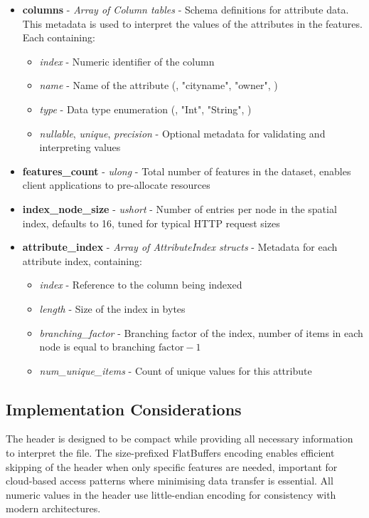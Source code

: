 \begin{itemize}
  \item \textbf{columns} - \textit{Array of Column tables} - Schema definitions for attribute data. This metadata is used to interpret the values of the attributes in the features. Each containing:
    \begin{itemize}
      \item \textit{index} - Numeric identifier of the column
      \item \textit{name} - Name of the attribute (\eg, "cityname", "owner", \etc)
      \item \textit{type} - Data type enumeration (\eg, "Int", "String", \etc)
      \item \textit{nullable}, \textit{unique}, \textit{precision} - Optional metadata for validating and interpreting values
    \end{itemize}

  \item \textbf{features\_count} - \textit{ulong} - Total number of features in the dataset, enables client applications to pre-allocate resources

  \item \textbf{index\_node\_size} - \textit{ushort} - Number of entries per node in the spatial index, defaults to 16, tuned for typical HTTP request sizes

  \item \textbf{attribute\_index} - \textit{Array of AttributeIndex structs} - Metadata for each attribute index, containing:
    \begin{itemize}
      \item \textit{index} - Reference to the column being indexed
      \item \textit{length} - Size of the index in bytes
      \item \textit{branching\_factor} - Branching factor of the index, number of items in each node is equal to $\text{branching factor} - 1$
      \item \textit{num\_unique\_items} - Count of unique values for this attribute
    \end{itemize}
\end{itemize}

\subsection{Implementation Considerations}
\label{methodology:header:implementation_considerations}

The header is designed to be compact while providing all necessary information to interpret the file. The size-prefixed FlatBuffers encoding enables efficient skipping of the header when only specific features are needed, important for cloud-based access patterns where minimising data transfer is essential. All numeric values in the header use little-endian encoding for consistency with modern architectures.
